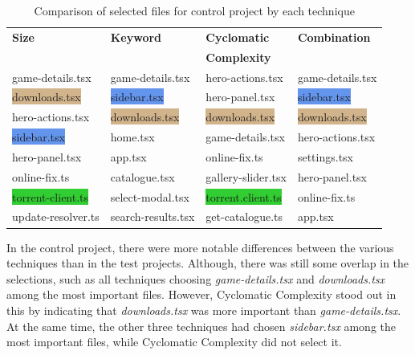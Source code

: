 \begin{table}[H]
  \centering
  \caption{Comparison of selected files for control project by each technique}
  \label{tab:Selected_files_control}
  \begin{tabularx}{\textwidth}{llll}
    \hline
     \textbf{Size} & \textbf{Keyword} & \textbf{Cyclomatic } & \textbf{Combination} \\
     \textbf{} & \textbf{} & \textbf{Complexity } & \textbf{} \\ [1ex] \hline \hline 
    \colorbox{BurntOrange}{game-details.tsx} & \colorbox{BurntOrange}{game-details.tsx} & \colorbox{Rhodamine}{hero-actions.tsx} & \colorbox{BurntOrange}{game-details.tsx} \\ [2ex]
    \colorbox{Tan}{downloads.tsx} & \colorbox{CornflowerBlue}{sidebar.tsx} & \colorbox{PineGreen}{hero-panel.tsx} & \colorbox{CornflowerBlue}{sidebar.tsx} \\ [2ex]
    \colorbox{Rhodamine}{hero-actions.tsx} & \colorbox{Tan}{downloads.tsx} & \colorbox{Tan}{downloads.tsx} & \colorbox{Tan}{downloads.tsx} \\ [2ex]
    \colorbox{CornflowerBlue}{sidebar.tsx} & home.tsx & \colorbox{BurntOrange}{game-details.tsx} & \colorbox{Rhodamine}{hero-actions.tsx} \\ [2ex] 
    \colorbox{PineGreen}{hero-panel.tsx} & \colorbox{WildStrawberry}{app.tsx} & \colorbox{Mulberry}{online-fix.ts} & settings.tsx \\ [2ex] 
    \colorbox{Mulberry}{online-fix.ts} & catalogue.tsx & gallery-slider.tsx & \colorbox{PineGreen}{hero-panel.tsx} \\ [2ex] 
    \colorbox{LimeGreen}{torrent-client.ts} & select-modal.tsx & \colorbox{LimeGreen}{torrent.client.ts} & \colorbox{Mulberry}{online-fix.ts} \\ [2ex]
    update-resolver.ts & search-results.tsx & get-catalogue.ts & \colorbox{WildStrawberry}{app.tsx} \\ [2ex] 

  \end{tabularx}
\end{table}

In the control project, there were more notable differences between the various techniques than in the test projects. Although, there was still some overlap in the selections, such as all techniques choosing \textit{game-details.tsx} and \textit{downloads.tsx} among the most important files. However, Cyclomatic Complexity stood out in this by indicating that \textit{downloads.tsx} was more important than \textit{game-details.tsx}. At the same time, the other three techniques had chosen \textit{sidebar.tsx} among the most important files, while Cyclomatic Complexity did not select it. \\

